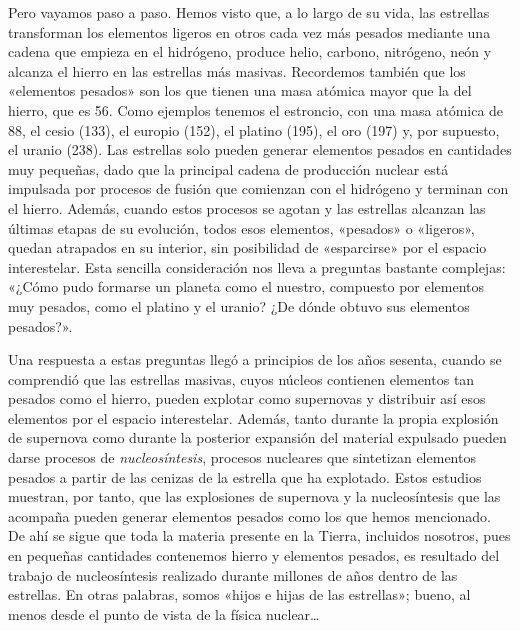 Pero vayamos paso a paso. Hemos visto que, a lo largo de su vida, las estrellas transforman los elementos ligeros en otros cada vez más pesados mediante una cadena que empieza en el hidrógeno, produce helio, carbono, nitrógeno, neón y alcanza el hierro en las estrellas más masivas. Recordemos también que los «elementos pesados» son los que tienen una masa atómica mayor que la del hierro, que es 56. Como ejemplos tenemos el estroncio, con una masa atómica de 88, el cesio (133), el europio (152), el platino (195), el oro (197) y, por supuesto, el uranio (238). Las estrellas solo pueden generar elementos pesados en cantidades muy pequeñas, dado que la principal cadena de producción nuclear está impulsada por procesos de fusión que comienzan con el hidrógeno y terminan con el hierro. Además, cuando estos procesos se agotan y las estrellas alcanzan las últimas etapas de su evolución, todos esos elementos, «pesados» o «ligeros», quedan atrapados en su interior, sin posibilidad de «esparcirse» por el espacio interestelar. Esta sencilla consideración nos lleva a preguntas bastante complejas: «¿Cómo pudo formarse un planeta como el nuestro, compuesto por elementos muy pesados, como el platino y el uranio? ¿De dónde obtuvo sus elementos pesados?».

Una respuesta a estas preguntas llegó a principios de los años sesenta, cuando se comprendió que las estrellas masivas, cuyos núcleos contienen elementos tan pesados como el hierro, pueden explotar como supernovas y distribuir así esos elementos por el espacio interestelar. Además, tanto durante la propia explosión de supernova como durante la posterior expansión del material expulsado pueden darse procesos de \emph{nucleosíntesis}, procesos nucleares que sintetizan elementos pesados a partir de las cenizas de la estrella que ha explotado. Estos estudios muestran, por tanto, que las explosiones de supernova y la nucleosíntesis que las acompaña pueden generar elementos pesados como los que hemos mencionado. De ahí se sigue que toda la materia presente en la Tierra, incluidos nosotros, pues en pequeñas cantidades contenemos hierro y elementos pesados, es resultado del trabajo de nucleosíntesis realizado durante millones de años dentro de las estrellas. En otras palabras, somos «hijos e hijas de las estrellas»; bueno, al menos desde el punto de vista de la física nuclear\ldots{}

